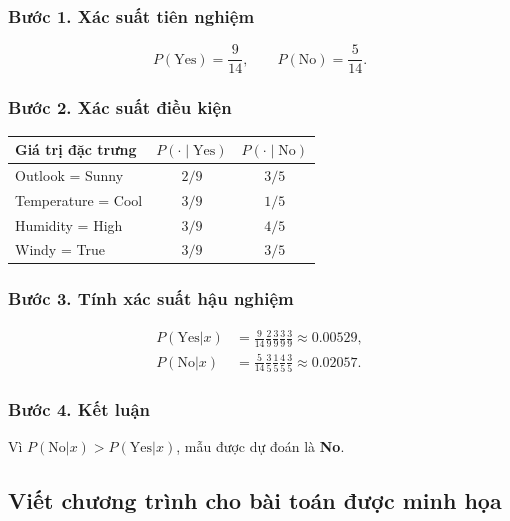 \subsubsection{Bước 1. Xác suất tiên nghiệm}
\[
P(\mathrm{Yes})=\frac{9}{14},\qquad P(\mathrm{No})=\frac{5}{14}.
\]
\subsubsection{Bước 2. Xác suất điều kiện}
\begin{center}\small
\begin{tabular}{@{}lcc@{}}\toprule
Giá trị đặc trưng&$P(\cdot\mid\mathrm{Yes})$&$P(\cdot\mid\mathrm{No})$\\\midrule
Outlook = Sunny&$2/9$&$3/5$\\
Temperature = Cool&$3/9$&$1/5$\\
Humidity = High&$3/9$&$4/5$\\
Windy = True&$3/9$&$3/5$\\\bottomrule
\end{tabular}\end{center}
\subsubsection{Bước 3. Tính xác suất hậu nghiệm}
\begin{align*}
P(\mathrm{Yes}\vert{}x)&=\frac9{14}\frac29\frac39\frac39\frac39\approx 0.00529,\\
P(\mathrm{No}\vert{}x)&=\frac5{14}\frac35\frac15\frac45\frac35\approx 0.02057.
\end{align*}
\subsubsection{Bước 4. Kết luận}
Vì $P(\mathrm{No}\vert{}x)>P(\mathrm{Yes}\vert{}x)$, mẫu được dự đoán là \textbf{No}.

\subsection{Viết chương trình cho bài toán được minh họa}


